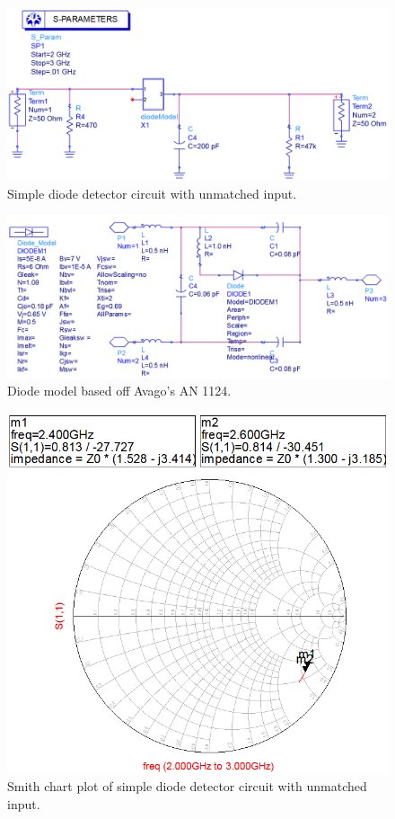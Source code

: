 \documentclass[conference]{IEEEtran}
\begin{document}
\begin{figure}[!htb]
\centering
\includegraphics[scale=0.25]{diode-pics/diodedetectorSimplifiedSchematic.png}
\caption{Simple diode detector circuit with unmatched input.}
\label{fig:DDSchematic}
\end{figure}

\begin{figure}[!htb]
\centering
\includegraphics[scale=0.25]{diode-pics/diodedetectormodel.png}
\caption{Diode model based off Avago's AN 1124.}
\label{fig:diodeModel}
\end{figure}

\begin{figure}[!htb]
\centering
\includegraphics[scale=0.4]{diode-pics/diodedetectorSimplifiedSmithChart.png}
\caption{Smith chart plot of simple diode detector circuit with unmatched input.}
\label{fig:DDPlot}
\end{figure}
\end{document}
